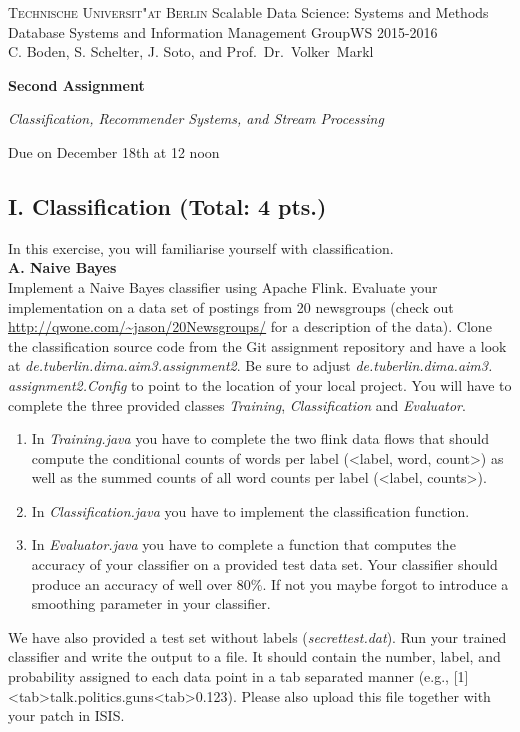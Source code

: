 \documentclass[11pt,a4paper]{article}
\begin{document}
\textsc{Technische Universit"at Berlin}{\small\hfill 
Scalable Data Science: Systems and Methods }\\
{\small Database Systems and Information Management Group{\small\hfill WS 2015-2016}\\
C. Boden, S. Schelter, J. Soto, and Prof.~Dr.~Volker~Markl}

\bigskip
\centerline{\Large\textbf{Second Assignment}}
\centerline{\emph{{Classification, Recommender Systems, and Stream Processing}}}
\centerline{Due on December 18th at 12 noon}
\bigskip


\subsection*{I. Classification (Total: 4 pts.)}
In this exercise, you will familiarise yourself with classification.\\ 

\textbf{A. Naive Bayes}\\

Implement a Naive Bayes classifier using Apache Flink. Evaluate your implementation on a data set of postings from 20 newsgroups (check out \url{http://qwone.com/~jason/20Newsgroups/} for a description of the data). Clone the classification source code from the Git assignment repository and have a look at \textit{de.tuberlin.dima.aim3.assignment2}. Be sure to adjust \textit{de.tuberlin.dima.aim3. assignment2.Config} to point to the location of your local project. You will have to complete the three provided classes \textit{Training}, \textit{Classification} and \textit{Evaluator}. 

\begin{enumerate}
	\item In \emph{Training.java} you have to complete the two flink data flows that should compute the conditional counts of words per label (<label, word, count>) as well as the summed counts of all word counts per label (<label, counts>).
	\item In \emph{Classification.java} you have to implement the classification function.
	\item  In \emph{Evaluator.java} you have to complete a function that computes the accuracy of your classifier on a provided test data set. Your classifier should produce an accuracy of well over 80\%. If not you maybe forgot to introduce a smoothing parameter in your classifier.
\end{enumerate}

We have also provided a test set without labels (\textit{secrettest.dat}). Run your trained classifier and write the output to a file. It should contain the number, label, and probability assigned to each data point in a tab separated manner (e.g., [1]<tab>talk.politics.guns<tab>0.123). Please also upload this file together with your patch in ISIS. \\
\end{document}
